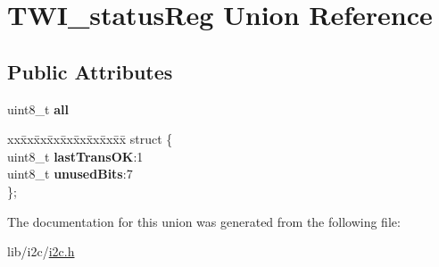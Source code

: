 \hypertarget{union_t_w_i__status_reg}{}\section{T\+W\+I\+\_\+status\+Reg Union Reference}
\label{union_t_w_i__status_reg}
\subsection*{Public Attributes}
\begin{DoxyCompactItemize}
\item 
uint8\+\_\+t {\bfseries all}\hypertarget{union_t_w_i__status_reg_a8f2427c1731d117f083e1923283b64ca}{}\label{union_t_w_i__status_reg_a8f2427c1731d117f083e1923283b64ca}

\item 
\begin{tabbing}
xx\=xx\=xx\=xx\=xx\=xx\=xx\=xx\=xx\=\kill
struct \{\\
\>uint8\_t {\bfseries lastTransOK}:1\\
\>uint8\_t {\bfseries unusedBits}:7\\
\}; \hypertarget{union_t_w_i__status_reg_add7d1a7a0e0ddd8a960f89dd9aa97b0f}{}\label{union_t_w_i__status_reg_add7d1a7a0e0ddd8a960f89dd9aa97b0f}
\\

\end{tabbing}\end{DoxyCompactItemize}


The documentation for this union was generated from the following file\+:\begin{DoxyCompactItemize}
\item 
lib/i2c/\hyperlink{i2c_8h}{i2c.\+h}\end{DoxyCompactItemize}
